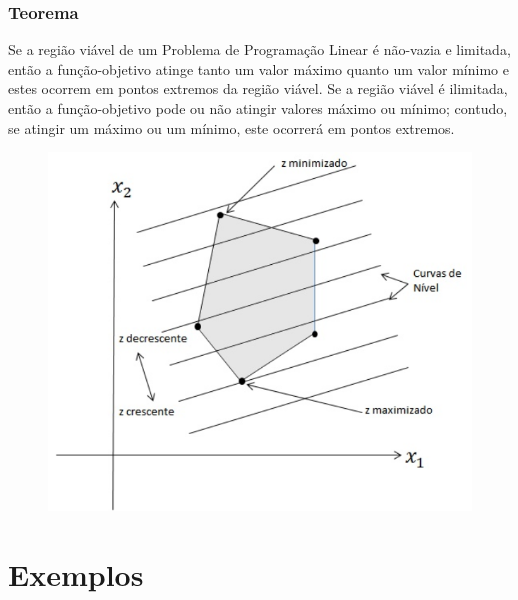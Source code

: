 \documentclass[hyperref={pdfpagelabels=false}]{beamer}
\begin{document}
\begin{frame}
\frametitle{Teorema}
Se a região viável de um Problema de Programação Linear é não-vazia e limitada, então a função-objetivo atinge tanto um valor máximo quanto um valor mínimo e estes ocorrem em pontos extremos da região viável. Se a região viável é ilimitada, então a função-objetivo pode ou não atingir valores máximo ou mínimo; contudo, se atingir um máximo ou um mínimo, este ocorrerá em pontos extremos.

\begin{figure}[!h]
	\centering
	\includegraphics[scale=0.3]{teo}
	\label{teo}
\end{figure}

\end{frame}

\section{Exemplos}
\end{document}
